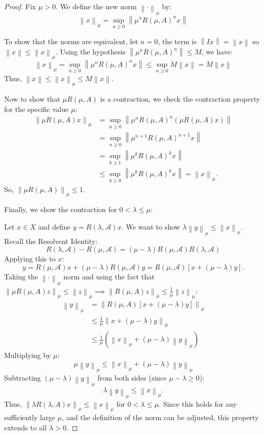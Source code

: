 \documentclass[12pt, oneside]{book}
\newcommand{\norm}[1]{\left\lVert#1\right\rVert}
\newcommand{\A}{\mathscr{A}}
\begin{document}
\begin{proof}
	Fix $\mu > 0$. We define the new norm $\norm{\cdot}_\mu$ by:
$$
	\norm{x}_\mu = \sup_{n \ge 0} \norm{\mu^n R(\mu, A)^n x}
$$

To show that the norms are equivalent, let $n=0$, the term is $\norm{I x} = \norm{x}$ so $\norm{x} \le \norm{x}_\mu$.
Using the hypothesis $\norm{\mu^n R(\mu, A)^n} \le M$, we have:
$$
	\norm{x}_\mu = \sup_{n \ge 0} \norm{\mu^n R(\mu, A)^n x} \le \sup_{n \ge 0} M \norm{x} = M \norm{x}
$$
Thus, $\norm{x} \le \norm{x}_\mu \le M \norm{x}$.

Now to show that $\mu R(\mu, A)$ is a contraction, we check the contraction property for the specific value $\mu$:
\begin{align*}
	\norm{\mu R(\mu, A) x}_\mu &= \sup_{n \ge 0} \norm{\mu^n R(\mu, A)^n (\mu R(\mu, A) x)} \\
				   &= \sup_{n \ge 0} \norm{\mu^{n+1} R(\mu, A)^{n+1} x} \\
				   &= \sup_{k \ge 1} \norm{\mu^k R(\mu, A)^k x} \\
				   &\le \sup_{k \ge 0} \norm{\mu^k R(\mu, A)^k x} = \norm{x}_\mu.
\end{align*}
So, $\norm{\mu R(\mu, A)}_\mu \le 1$.

Finally, we show the contraction for $0 < \lambda \le \mu$:

Let $x \in X$ and define $y = R(\lambda, \A)x$. We want to show $\lambda \norm{y}_\mu \le \norm{x}_\mu$.
Recall the Resolvent Identity:
$$
R(\lambda, \A) - R(\mu, \A) = (\mu - \lambda) R(\mu, \A) R(\lambda, \A)
$$
Applying this to $x$:
$$
y = R(\mu, \A)x + (\mu - \lambda) R(\mu, \A)y = R(\mu, \A) [x + (\mu - \lambda)y].
$$
Taking the $\norm{\cdot}_\mu$ norm and using the fact that $\norm{\mu R(\mu, A) z}_\mu \le \norm{z}_\mu \implies {\norm{R(\mu, A) z}_\mu \le \frac{1}{\mu} \norm{z}_\mu}$:
\begin{align*}
	\norm{y}_\mu &= \norm{R(\mu, A) [x + (\mu - \lambda)y]}_\mu \\
		     &\le \frac{1}{\mu} \norm{x + (\mu - \lambda)y}_\mu \\
		     &\le \frac{1}{\mu} \left( \norm{x}_\mu + (\mu - \lambda)\norm{y}_\mu \right)
\end{align*}
Multiplying by $\mu$:
$$
	\mu \norm{y}_\mu \le \norm{x}_\mu + (\mu - \lambda) \norm{y}_\mu
$$
Subtracting $(\mu - \lambda)\norm{y}_\mu$ from both sides (since $\mu - \lambda \ge 0$):
$$
\lambda \norm{y}_\mu \le \norm{x}_\mu.
$$
Thus, $\norm{\lambda R(\lambda, A)x}_\mu \le \norm{x}_\mu$ for $0 < \lambda \le \mu$.
Since this holds for any sufficiently large $\mu$, and the definition of the norm can be adjusted, this property extends to all $\lambda > 0$.
\end{proof}
\end{document}
